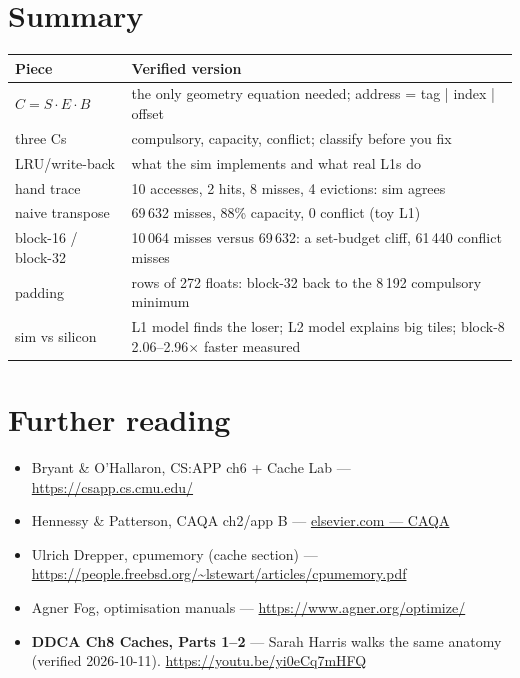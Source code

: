 \section{Summary}
\label{sec:summary10}
\begin{tabularx}{\linewidth}{@{}l X@{}}
\toprule
\textbf{Piece} & \textbf{Verified version} \\
\midrule
$C=S\cdot E\cdot B$  & the only geometry equation needed; address = tag | index | offset \\
three Cs  & compulsory, capacity, conflict; classify before you fix \\
LRU/write-back & what the sim implements and what real L1s do \\
hand trace & 10 accesses, 2 hits, 8 misses, 4 evictions: sim agrees \\
naive transpose & 69\,632 misses, 88\% capacity, 0 conflict (toy L1) \\
block-16 / block-32 & 10\,064 misses versus 69\,632: a set-budget cliff, 61\,440 conflict misses \\
padding & rows of 272 floats: block-32 back to the 8\,192 compulsory minimum \\
sim vs silicon & L1 model finds the loser; L2 model explains big tiles; block-8 2.06--2.96$\times$ faster measured \\
\bottomrule
\end{tabularx}

\section*{Further reading}
\label{sec:further10}
\begin{itemize}
\item Bryant \& O'Hallaron, CS:APP ch6 + Cache Lab ---
      \url{https://csapp.cs.cmu.edu/}
\item Hennessy \& Patterson, CAQA ch2/app B ---
      \href{https://www.elsevier.com/books/computer-architecture/hennessy/978-0-12-811905-1}{elsevier.com --- CAQA}
\item Ulrich Drepper, cpumemory (cache section) ---
      \url{https://people.freebsd.org/~lstewart/articles/cpumemory.pdf}
\item Agner Fog, optimisation manuals ---
      \url{https://www.agner.org/optimize/}
\end{itemize}

\begin{rulebox}
\begin{itemize}
\item \textbf{DDCA Ch8 Caches, Parts 1--2} --- Sarah Harris walks
      the same anatomy (verified 2026-10-11).
      \url{https://youtu.be/yi0eCq7mHFQ}
\end{itemize}
\end{rulebox}

